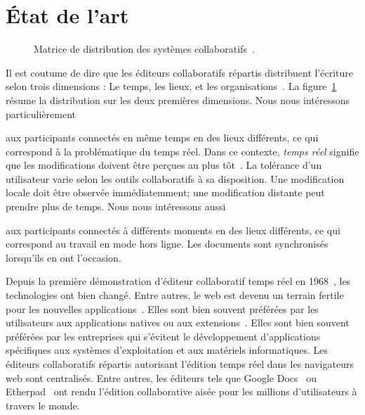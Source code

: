 
\section{État de l'art}
\label{editor:sec:stateoftheart}

\begin{figure}
  \begin{center}
    
    \caption[Matrice de distribution des systèmes collaboratifs] {
      \label{editor:fig:groupware} Matrice de distribution des systèmes
      collaboratifs~\cite{johansen1988groupware}.}
  \end{center}
\end{figure}


Il est coutume de dire que les éditeurs collaboratifs répartis distribuent
l'écriture selon trois dimensions : Le temps, les lieux, et les
organisations~\cite{johansen1988groupware}.  La
figure~\ref{editor:fig:groupware} résume la distribution sur les deux premières
dimensions.  Nous nous intéressons particulièrement 
\begin{inparaenum}[(i)]
\item aux participants connectés en même temps en des lieux différents, ce qui
  correspond à la problématique du temps réel. Dans ce contexte, \emph{temps
    réel} signifie que les modifications doivent être perçues au plus
  tôt~\cite{ellis1989concurrency}. La tolérance d'un utilisateur varie selon les
  outils collaboratifs à sa disposition. Une modification locale doit être
  observée immédiatemment; une modification distante peut prendre plus de temps.
  Nous nous intéressons aussi
\item aux participants connectés à différents moments en des lieux différents,
  ce qui correspond au travail en mode hors ligne. Les documents sont
  synchronisés lorsqu'ils en ont l'occasion.
\end{inparaenum}

Depuis la première démonstration d'éditeur collaboratif temps réel en
1968~\cite{engelbart1968research}, les technologies ont bien changé. Entre
autres, le web est devenu un terrain fertile pour les nouvelles
applications~\cite{lautamaki2013development}. Elles sont bien souvent préférées
par les utilisateurs aux applications natives ou aux
extensions~\cite{mogan2010impact}. Elles sont bien souvent préférées par les
entreprises qui s'évitent le développement d'applications spécifiques aux
systèmes d'exploitation et aux matériels informatiques.  Les éditeurs
collaboratifs répartis autorisant l'édition temps réel dans les navigateurs web
sont centralisés. Entre autres, les éditeurs tels que Google
Docs~\cite{googledocs} ou Etherpad~\cite{etherpad} ont rendu l'édition
collaborative aisée pour les millions d'utilisateurs à travers le monde.

